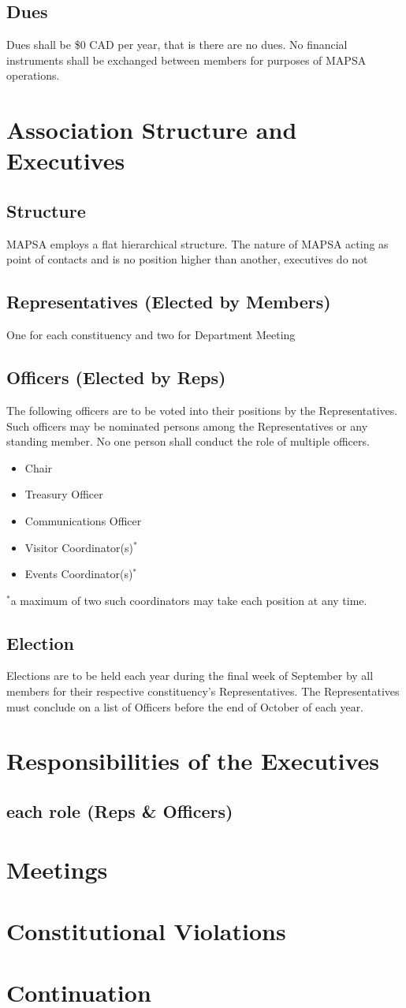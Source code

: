 \documentclass[twocolumn,reprint,nofootinbib,longbibliography,prd,superscriptaddress]{revtex4-2}
\begin{document}
\subsection{Dues}
Dues shall be \$0 CAD per year, that is there are no dues. No financial instruments shall be exchanged between members for purposes of MAPSA operations.

\section{Association Structure and Executives}
\subsection{Structure}
MAPSA employs a flat hierarchical structure. The nature of MAPSA  acting as point of contacts and  is no position higher than another, executives do not 
\subsection{Representatives (Elected by Members)}
One for each constituency and two for Department Meeting 
\subsection{Officers (Elected by Reps)}
The following officers are to be voted into their positions by the Representatives. Such officers may be nominated persons among the Representatives or any standing member. No one person shall conduct the role of multiple officers.
\begin{itemize}
	\item Chair
	\item Treasury Officer
	\item Communications Officer
	\item Visitor Coordinator(s)$^*$
	\item Events Coordinator(s)$^*$
\end{itemize}
$^*$a maximum of two such coordinators may take each position at any time.
\subsection{Election}
Elections are to be held each year during the final week of September by all members for their respective constituency's Representatives. The Representatives must conclude on a list of Officers before the end of October of each year.

\section{Responsibilities of the Executives}
\subsection{each role (Reps \& Officers)}

\section{Meetings}


\section{Constitutional Violations}
\section{Continuation }
\end{document}
